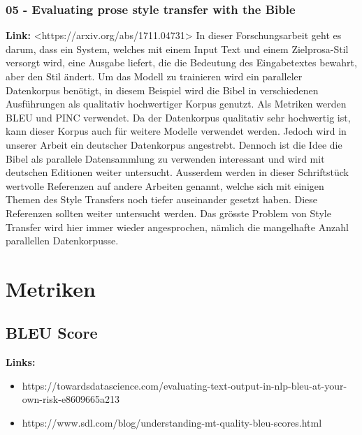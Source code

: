 \subsubsection{05 - Evaluating prose style transfer with the Bible}
\textbf{Link: } <https://arxiv.org/abs/1711.04731>
\newline
\newline
In dieser Forschungsarbeit geht es darum, dass ein System, welches mit einem Input Text und einem Zielprosa-Stil
versorgt wird, eine Ausgabe liefert, die die Bedeutung des Eingabetextes bewahrt, aber den Stil ändert. Um das Modell zu
trainieren wird ein paralleler Datenkorpus benötigt, in diesem Beispiel wird die Bibel in verschiedenen Ausführungen als
qualitativ hochwertiger Korpus genutzt. Als Metriken werden \gls{BLEU} und PINC verwendet.
\newline
\newline
Da der Datenkorpus qualitativ sehr hochwertig ist, kann dieser Korpus auch für weitere Modelle verwendet werden. Jedoch
wird in unserer Arbeit ein deutscher Datenkorpus angestrebt. Dennoch ist die Idee die Bibel als parallele Datensammlung
zu verwenden interessant und wird mit deutschen Editionen weiter untersucht.
\newline
\newline
Ausserdem werden in dieser Schriftstück wertvolle Referenzen auf andere Arbeiten genannt, welche sich mit einigen Themen
des Style Transfers noch tiefer auseinander gesetzt haben. Diese Referenzen sollten weiter untersucht werden.
\newline
\newline
Das grösste Problem von Style Transfer wird hier immer wieder angesprochen, nämlich die mangelhafte Anzahl parallellen
Datenkorpusse.

\section{Metriken}

\subsection{BLEU Score}
\textbf{Links:}
\begin{itemize}
    \item https://towardsdatascience.com/evaluating-text-output-in-nlp-bleu-at-your-own-risk-e8609665a213
    \item https://www.sdl.com/blog/understanding-mt-quality-bleu-scores.html
\end{itemize}

